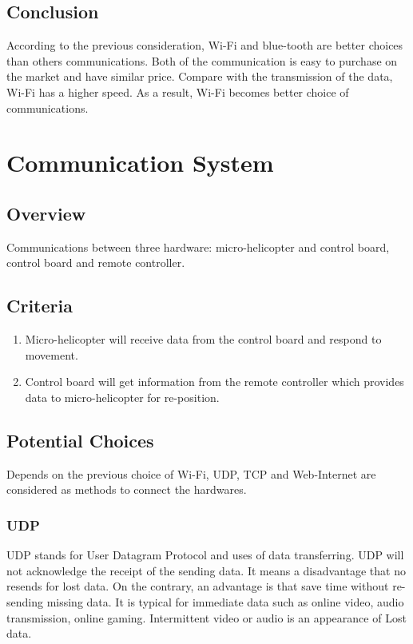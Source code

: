 \documentclass[letterpaper, 10, draftclsnofoot, onecolumn, compsoc]{IEEEtran}
\begin{document}
{\subsection{Conclusion}
According to the previous consideration, Wi-Fi and blue-tooth are better choices than others communications.
Both of the communication is easy to purchase on the market and have similar price.
Compare with the transmission of the data, Wi-Fi has a higher speed. As a result, Wi-Fi becomes better choice of communications.

\section{Communication System}

\subsection{Overview}
Communications between three hardware: micro-helicopter and control board, control board and remote controller.


\subsection{Criteria}
\begin{enumerate}
\item{Micro-helicopter will receive data from the control board and respond to movement.}
\item{Control board will get information from the remote controller which provides data to micro-helicopter for re-position.}
\end{enumerate}

\subsection{Potential Choices}
Depends on the previous choice of Wi-Fi, UDP, TCP and Web-Internet are considered as methods to connect the hardwares.

\subsubsection{UDP}
UDP\cite{r4} stands for User Datagram Protocol and uses of data transferring.
UDP will not acknowledge the receipt of the sending data.
It means a disadvantage that no resends for lost data.
On the contrary, an advantage is that save time without re-sending missing data.
It is typical for immediate data such as online video, audio transmission, online gaming.
Intermittent video or audio is an appearance of Lost data.

}
\end{document}
